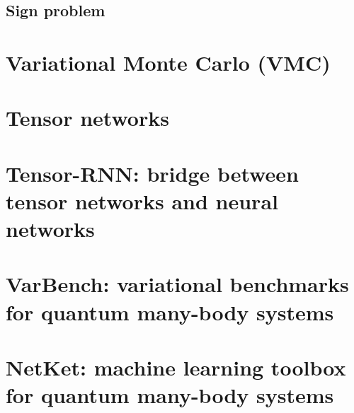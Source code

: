 \section{Sign problem}

\chapter{Variational Monte Carlo (VMC)}

\chapter{Tensor networks}

\chapter{Tensor-RNN: bridge between tensor networks and neural networks}

\chapter{VarBench: variational benchmarks for quantum many-body systems}

\chapter{NetKet: machine learning toolbox for quantum many-body systems}

